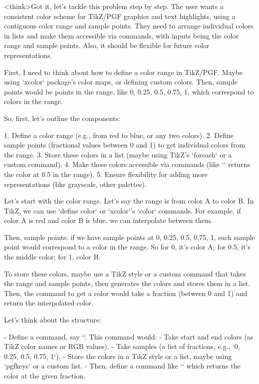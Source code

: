 <think>Got it, let's tackle this problem step by step. The user wants a consistent color scheme for TikZ/PGF graphics and text highlights, using a contiguous color range and sample points. They need to arrange individual colors in lists and make them accessible via commands, with inputs being the color range and sample points. Also, it should be flexible for future color representations.

First, I need to think about how to define a color range in TikZ/PGF. Maybe using `xcolor` package's color maps, or defining custom colors. Then, sample points would be points in the range, like 0, 0.25, 0.5, 0.75, 1, which correspond to colors in the range.

So, first, let's outline the components:

1. Define a color range (e.g., from red to blue, or any two colors).
2. Define sample points (fractional values between 0 and 1) to get individual colors from the range.
3. Store these colors in a list (maybe using TikZ's `foreach` or a custom command).
4. Make these colors accessible via commands (like `` returns the color at 0.5 in the range).
5. Ensure flexibility for adding more representations (like grayscale, other palettes).

Let's start with the color range. Let's say the range is from color A to color B. In TikZ, we can use `define color` or `xcolor`'s `color` commands. For example, if color A is red and color B is blue, we can interpolate between them.

Then, sample points: if we have sample points at 0, 0.25, 0.5, 0.75, 1, each sample point would correspond to a color in the range. So for 0, it's color A; for 0.5, it's the middle color; for 1, color B.

To store these colors, maybe use a TikZ style or a custom command that takes the range and sample points, then generates the colors and stores them in a list. Then, the command to get a color would take a fraction (between 0 and 1) and return the interpolated color.

Let's think about the structure:

- Define a command, say ``. This command would:
  - Take start and end colors (as TikZ color names or RGB values).
  - Take samples (a list of fractions, e.g., `0, 0.25, 0.5, 0.75, 1`).
  - Store the colors in a TikZ style or a list, maybe using `pgfkeys` or a custom list.
  - Then, define a command like `` which returns the color at the given fraction.

